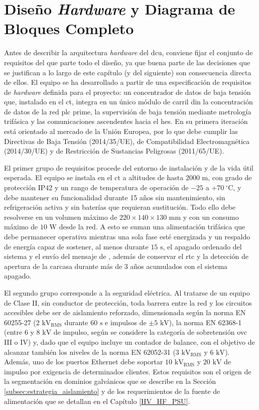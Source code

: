 \chapter{Diseño \textit{Hardware} y Diagrama de Bloques Completo}
\label{ch:hardware_design}

Antes de describir la arquitectura \textit{hardware} del \gls{dcu}, conviene fijar el conjunto de requisitos del que parte todo el diseño, ya que buena parte de las decisiones que se justifican a lo largo de este capítulo (y del siguiente) son consecuencia directa de ellos. El equipo se ha desarrollado a partir de una especificación de requisitos de \textit{hardware} definida para el proyecto: un concentrador de datos de baja tensión que, instalado en el \gls{ct}, integra en un único módulo de carril \gls{din} la concentración de datos de la red \gls{plc} \gls{prime}, la supervisión de baja tensión mediante metrología trifásica y las comunicaciones ascendentes hacia el \gls{hes}. En su primera iteración está orientado al mercado de la Unión Europea, por lo que debe cumplir las Directivas de Baja Tensión (2014/35/UE), de Compatibilidad Electromagnética (2014/30/UE) y de Restricción de Sustancias Peligrosas (2011/65/UE).

El primer grupo de requisitos procede del entorno de instalación y de la vida útil esperada. El equipo se instala en el \gls{ct} a altitudes de hasta $2000\text{ m}$, con grado de protección IP42 y un rango de temperatura de operación de $-25$ a $+70\ ^\circ\text{C}$, y debe mantener su funcionalidad durante 15 años sin mantenimiento, sin refrigeración activa y sin baterías que requieran sustitución. Todo ello debe resolverse en un volumen máximo de $220\times140\times130\text{ mm}$ y con un consumo máximo de $10\text{ W}$ desde la red. A esto se suman una alimentación trifásica que debe permanecer operativa mientras una sola fase esté energizada y un respaldo de energía capaz de sostener, al menos durante $15\text{ s}$, el apagado ordenado del sistema y el envío del mensaje de \textit{}, además de conservar el \gls{rtc} y la detección de apertura de la carcasa durante más de 3 años acumulados con el sistema apagado.

El segundo grupo corresponde a la seguridad eléctrica. Al tratarse de un equipo de Clase II, sin conductor de protección, toda barrera entre la red y los circuitos accesibles debe ser de aislamiento reforzado, dimensionada según la norma EN 60255-27 ($2\text{ kV}_{\text{RMS}}$ durante $60\text{ s}$ e impulsos de $\pm5\text{ kV}$), la norma EN 62368-1 (entre $6$ y $8\text{ kV}$ de impulso, según se considere la categoría de sobretensión \gls{ovc} III o IV) y, dado que el equipo incluye un contador de balance, con el objetivo de alcanzar también los niveles de la norma EN 62052-31 ($3\text{ kV}_{\text{RMS}}$ y $6\text{ kV}$). Además, uno de los puertos Ethernet debe soportar $10\text{ kV}_{\text{RMS}}$ y $20\text{ kV}$ de impulso por exigencia de determinados clientes. Estos requisitos son el origen de la segmentación en dominios galvánicos que se describe en la Sección \ref{subsec:estrategia_aislamiento} y de los requerimientos de la fuente de alimentación que se detallan en el Capítulo \ref{HV_HF_PSU}.

